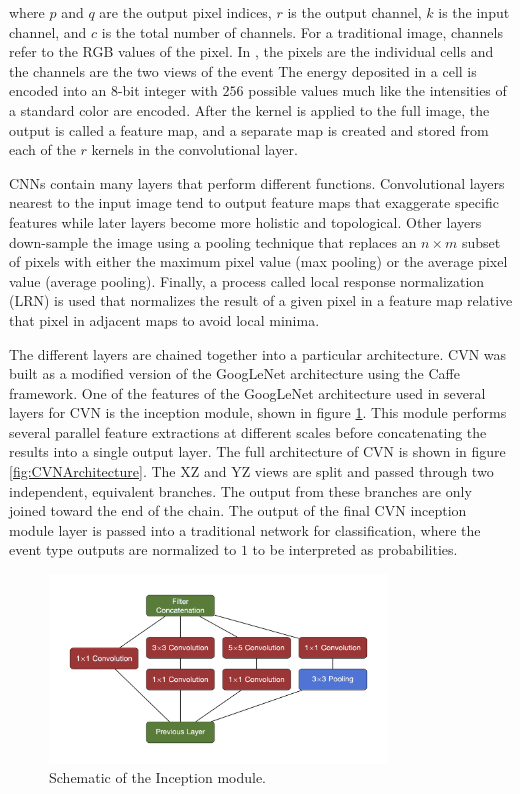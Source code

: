 \n where $p$ and $q$ are the output pixel indices, $r$ is the output channel, $k$ is the input channel, and $c$ is the total number of channels. For a traditional image, channels refer to the RGB values of the pixel. In \nova, the pixels are the individual cells and the channels are the two views of the event The energy deposited in a cell is encoded into an $8$-bit integer with $256$ possible values much like the intensities of a standard color are encoded. After the kernel is applied to the full image, the output is called a feature map, and a separate map is created and stored from each of the $r$ kernels in the convolutional layer. 

CNNs contain many layers that perform different functions. Convolutional layers nearest to the input image tend to output feature maps that exaggerate specific features while later layers become more holistic and topological. Other layers down-sample the image using a pooling technique that replaces an $n\times m$ subset of pixels with either the maximum pixel value (max pooling) or the average pixel value (average pooling). Finally, a process called local response normalization (LRN) is used that normalizes the result of a given pixel in a feature map relative that pixel in adjacent maps to avoid local minima.

The different layers are chained together into a particular architecture. CVN was built as a modified version of the GoogLeNet \cite{ref:GoogLeNet} architecture using the Caffe \cite{ref:Caffe} framework. One of the features of the GoogLeNet architecture used in several layers for CVN is the inception module, shown in figure \ref{fig:CVNInception}. This module performs several parallel feature extractions at different scales before concatenating the results into a single output layer. The full architecture of CVN is shown in figure \ref{fig:CVNArchitecture}. The XZ and YZ views are split and passed through two independent, equivalent branches. The output from these branches are only joined toward the end of the chain. The output of the final CVN inception module layer is passed into a traditional network for classification, where the event type outputs are normalized to $1$ to be interpreted as probabilities.
\begin{figure}[htb]
  \centering
  \includegraphics[width=0.8\textwidth]{figures/CVN/Inception.png}
  \caption[Inception Module Schematic]{Schematic of the Inception module.}
  \label{fig:CVNInception}
\end{figure}

